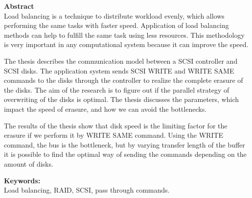 {\bf Abstract}\\


Load balancing is a technique to distribute workload evenly, which allows performing the same tasks with faster speed. Application of load balancing methods can help to fulfill the same task using less resources. This methodology is very important in any computational system because it can improve the speed. 

The thesis describes the communication model between a SCSI controller and SCSI disks. The application system sends SCSI WRITE and WRITE SAME commands to the disks through the controller to realize the complete erasure of the disks. The aim of the research is to figure out if the parallel strategy of overwriting of the disks is optimal. The thesis discusses the parameters, which impact the speed of erasure, and how we can avoid the bottlenecks.

The results of the thesis show that disk speed is the limiting factor for the erasure if we perform it by WRITE SAME command. Using the WRITE command, the bus is the bottleneck, but by varying transfer length of the buffer it is possible to find the optimal way of sending the commands depending on the amount of disks.





{\bf Keywords:}\\
Load balancing, RAID, SCSI, pass through commands.
